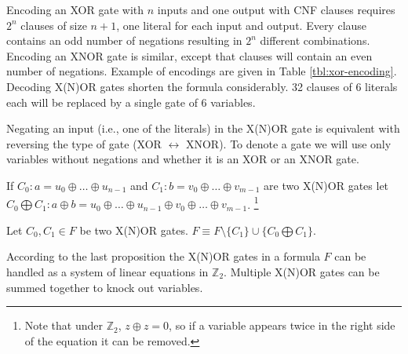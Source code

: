 Encoding an XOR gate with $n$ inputs and one output with CNF
clauses requires $2^n$ clauses of size $n + 1$, one literal for
each input and output.  Every clause contains an odd number of
negations resulting in $2^n$ different combinations. Encoding an
XNOR gate is similar, except that clauses will contain an even
number of negations.  Example of encodings are given in Table
\ref{tbl:xor-encoding}.  Decoding X(N)OR gates shorten the formula
considerably. 32 clauses of 6 literals each will be replaced by a
single gate of 6 variables.

Negating an input (i.e., one of the literals) in the X(N)OR gate is
equivalent with reversing the type of gate (XOR $\leftrightarrow$
XNOR). To denote a gate we will use only variables without negations
and whether it is an XOR or an XNOR gate.


\begin{table}
  \centering

  \caption{Example of CNF encodings of XOR and XNOR gates}
  \label{tbl:xor-encoding}
\end{table}


\begin{mydef}
  \label{myprop:xor-sum}
  If $C_0: a = u_0 \oplus \ldots \oplus u_{n-1}$ and $C_1: b =
  v_0 \oplus \ldots \oplus v_{m-1}$ are two X(N)OR gates let $C_0
  \bigoplus C_1: a \oplus b = u_0 \oplus \ldots \oplus u_{n-1}
  \oplus v_0 \oplus \ldots \oplus v_{m-1}$. \footnote{Note that
  under $\mathbb{Z}_2$, $z \oplus z = 0$, so if a variable appears
  twice in the right side of the equation it can be removed.}
\end{mydef}

\begin{myprop}
  Let $C_0, C_1 \in F$ be two X(N)OR gates. $F \equiv F \setminus \{C_1\} \cup
  \{C_0 \bigoplus C_1\}$.
\end{myprop}

According to the last proposition the X(N)OR gates in a
formula $F$ can be handled as a system of linear equations in
$\mathbb{Z}_2$. Multiple X(N)OR gates can be summed together to
knock out variables.

